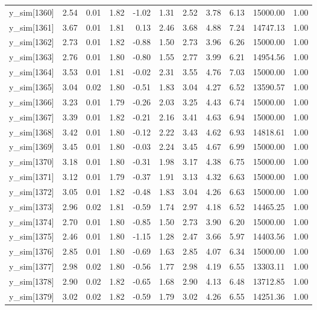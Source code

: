 \begin{table}[ht]
\begin{tabular}{rrrrrrrrrrr}
  y\_sim[1360] & 2.54 & 0.01 & 1.82 & -1.02 & 1.31 & 2.52 & 3.78 & 6.13 & 15000.00 & 1.00 \\ 
  y\_sim[1361] & 3.67 & 0.01 & 1.81 & 0.13 & 2.46 & 3.68 & 4.88 & 7.24 & 14747.13 & 1.00 \\ 
  y\_sim[1362] & 2.73 & 0.01 & 1.82 & -0.88 & 1.50 & 2.73 & 3.96 & 6.26 & 15000.00 & 1.00 \\ 
  y\_sim[1363] & 2.76 & 0.01 & 1.80 & -0.80 & 1.55 & 2.77 & 3.99 & 6.21 & 14954.56 & 1.00 \\ 
  y\_sim[1364] & 3.53 & 0.01 & 1.81 & -0.02 & 2.31 & 3.55 & 4.76 & 7.03 & 15000.00 & 1.00 \\ 
  y\_sim[1365] & 3.04 & 0.02 & 1.80 & -0.51 & 1.83 & 3.04 & 4.27 & 6.52 & 13590.57 & 1.00 \\ 
  y\_sim[1366] & 3.23 & 0.01 & 1.79 & -0.26 & 2.03 & 3.25 & 4.43 & 6.74 & 15000.00 & 1.00 \\ 
  y\_sim[1367] & 3.39 & 0.01 & 1.82 & -0.21 & 2.16 & 3.41 & 4.63 & 6.94 & 15000.00 & 1.00 \\ 
  y\_sim[1368] & 3.42 & 0.01 & 1.80 & -0.12 & 2.22 & 3.43 & 4.62 & 6.93 & 14818.61 & 1.00 \\ 
  y\_sim[1369] & 3.45 & 0.01 & 1.80 & -0.03 & 2.24 & 3.45 & 4.67 & 6.99 & 15000.00 & 1.00 \\ 
  y\_sim[1370] & 3.18 & 0.01 & 1.80 & -0.31 & 1.98 & 3.17 & 4.38 & 6.75 & 15000.00 & 1.00 \\ 
  y\_sim[1371] & 3.12 & 0.01 & 1.79 & -0.37 & 1.91 & 3.13 & 4.32 & 6.63 & 15000.00 & 1.00 \\ 
  y\_sim[1372] & 3.05 & 0.01 & 1.82 & -0.48 & 1.83 & 3.04 & 4.26 & 6.63 & 15000.00 & 1.00 \\ 
  y\_sim[1373] & 2.96 & 0.02 & 1.81 & -0.59 & 1.74 & 2.97 & 4.18 & 6.52 & 14465.25 & 1.00 \\ 
  y\_sim[1374] & 2.70 & 0.01 & 1.80 & -0.85 & 1.50 & 2.73 & 3.90 & 6.20 & 15000.00 & 1.00 \\ 
  y\_sim[1375] & 2.46 & 0.01 & 1.80 & -1.15 & 1.28 & 2.47 & 3.66 & 5.97 & 14403.56 & 1.00 \\ 
  y\_sim[1376] & 2.85 & 0.01 & 1.80 & -0.69 & 1.63 & 2.85 & 4.07 & 6.34 & 15000.00 & 1.00 \\ 
  y\_sim[1377] & 2.98 & 0.02 & 1.80 & -0.56 & 1.77 & 2.98 & 4.19 & 6.55 & 13303.11 & 1.00 \\ 
  y\_sim[1378] & 2.90 & 0.02 & 1.82 & -0.65 & 1.68 & 2.90 & 4.13 & 6.48 & 13712.85 & 1.00 \\ 
  y\_sim[1379] & 3.02 & 0.02 & 1.82 & -0.59 & 1.79 & 3.02 & 4.26 & 6.55 & 14251.36 & 1.00 \\ 

\end{tabular}
\end{table}
